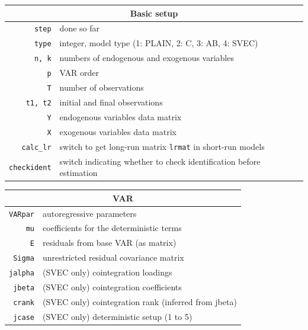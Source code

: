 \documentclass[a4paper,10pt]{article}
\begin{document}
  \centering
  \begin{tabular}{rp{}}
    \hline
    \multicolumn{2}{c}{\textbf{Basic setup}} \\
    \hline
    \texttt{step} & done so far \\
    \texttt{type} & integer, model type (1: PLAIN, 2: C, 3: AB, 4: SVEC)\\
    \texttt{n, k}	  & numbers of endogenous and exogenous variables \\
    \texttt{p}	  & VAR order \\
    \texttt{T}	  & number of observations \\
    \texttt{t1, t2}	  & initial and final observations \\
    \texttt{Y}	  & endogenous variables data matrix \\
    \texttt{X}	  & exogenous variables data matrix \\
    \texttt{calc\_lr} & switch to get long-run matrix \texttt{lrmat} in short-run models \\ 
    \texttt{checkident} & switch indicating whether to check identification before 
    estimation\\
    \end{tabular}
    
    \begin{tabular}{rp{}}
    \hline
    \multicolumn{2}{c}{\textbf{VAR}} \\
    \hline
    \texttt{VARpar} & autoregressive parameters \\
    \texttt{mu}	    & coefficients for the deterministic terms \\
    \texttt{E}	    & residuals from base VAR (as matrix) \\
    \texttt{Sigma}  & unrestricted residual covariance matrix \\
    \texttt{jalpha} & (SVEC only) cointegration loadings \\
    \texttt{jbeta}  & (SVEC only) cointegration coefficients \\
    \texttt{crank} & (SVEC only) cointegration rank (inferred from jbeta)\\
    \texttt{jcase} & (SVEC only) deterministic setup (1 to 5)\\
     \end{tabular}
    
\end{document}
